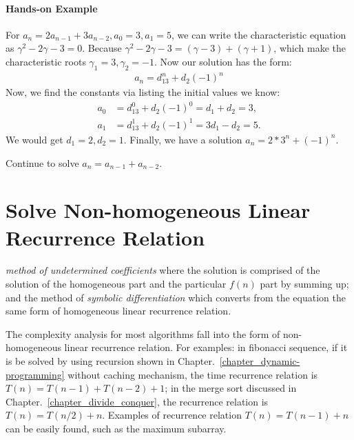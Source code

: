 \documentclass[../main.tex]{subfiles}
\begin{document}
\paragraph{Hands-on Example}
For $a_n = 2a_{n-1} + 3a_{n-2}, a_0=3, a_1=5$, we can write the characteristic equation as $\gamma^2-2\gamma-3=0$. Because $\gamma^2-2\gamma-3 = (\gamma-3)+(\gamma+1)$, which make the characteristic roots $\gamma_1=3, \gamma_2=-1$. Now our solution has the form:
\begin{align}
    a_n = d_13^n+d_2{(-1)}^{n}
\end{align}
Now, we find the constants via listing the initial values we know:
\begin{align}
    a_0 &= d_13^0+d_2{(-1)}^{0} = d_1+d_2=3, \\
 a_1 &= d_13^1+d_2{(-1)}^{1} = 3d_1-d_2=5.
\end{align}
We would get $d_1=2, d_2=1$. Finally, we have a solution $a_n = 2*3^n+(-1)^n$. 
\begin{bclogo}[couleur = blue!30, arrondi=0.1,logo=\bccrayon,ombre=true]{Continue to solve $a_n=a_{n-1}+a_{n-2}$.}
\end{bclogo}

\section{Solve Non-homogeneous Linear Recurrence Relation}
\label{subsec_non_homogeneous}
 \textit{method of undetermined coefficients} where the solution is comprised of the solution of the homogeneous part and the particular $f(n)$ part by summing up; and the method of \textit{symbolic differentiation} which converts from the equation the same form of homogeneous linear recurrence relation. 
 
The complexity analysis for most algorithms fall into the form of non-homogeneous linear recurrence relation. For examples: in fibonacci sequence, if it is be solved by using recursion shown in Chapter.~\ref{chapter_dynamic-programming} without caching mechanism, the time recurrence relation is $T(n)=T(n-1)+T(n-2)+1$; in the merge sort discussed in Chapter.~\ref{chapter_divide_conquer}, the recurrence relation is $T(n)=T(n/2)+n$. Examples of recurrence relation $T(n)=T(n-1)+n$ can be easily found, such as the maximum subarray. 
\end{document}
